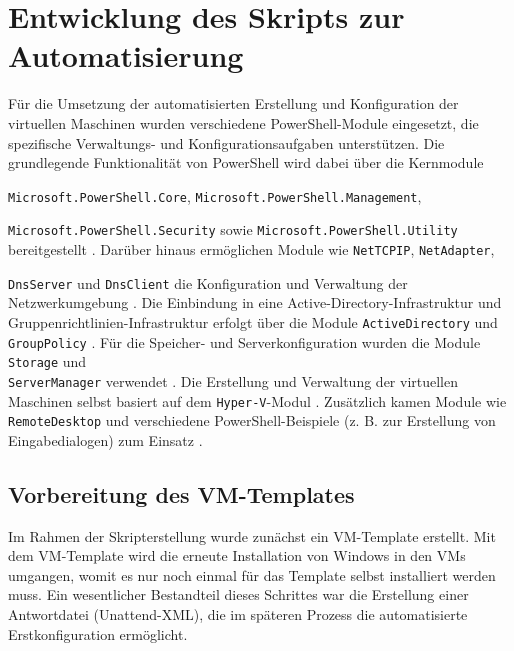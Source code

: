 \documentclass[a4paper,12pt]{article}
\begin{document}
\section{Entwicklung des Skripts zur Automatisierung}

Für die Umsetzung der automatisierten Erstellung und Konfiguration der virtuellen Maschinen
wurden verschiedene PowerShell-Module eingesetzt, die spezifische Verwaltungs- und
Konfigurationsaufgaben unterstützen. 
Die grundlegende Funktionalität von PowerShell wird dabei über die Kernmodule

\lstinline|Microsoft.PowerShell.Core|, \lstinline|Microsoft.PowerShell.Management|,

\lstinline|Microsoft.PowerShell.Security| sowie \lstinline|Microsoft.PowerShell.Utility| 
bereitgestellt \cite{microsoft2025-pscore,microsoft2025-psmanagement,microsoft2025-pssecurity,microsoft2025-psutility}. 
Darüber hinaus ermöglichen Module wie \lstinline|NetTCPIP|, \lstinline|NetAdapter|,
 
\lstinline|DnsServer| und \lstinline|DnsClient| die Konfiguration und Verwaltung der 
Netzwerkumgebung \cite{microsoft2025-nettcpip,microsoft2025-netadapter,microsoft2025-dnsserver,microsoft2025-dnsclient}. 
Die Einbindung in eine Active-Directory-Infrastruktur und Gruppenrichtlinien-Infrastruktur erfolgt über die Module 
\lstinline|ActiveDirectory| und \lstinline|GroupPolicy| \cite{microsoft2025-activedirectory,microsoft2025-grouppolicy}. 
Für die Speicher- und Serverkonfiguration wurden die Module \lstinline|Storage| und\\ \lstinline|ServerManager| 
verwendet \cite{microsoft2025-storage,microsoft2025-servermanager}. 
Die Erstellung und Verwaltung der virtuellen Maschinen selbst basiert auf dem 
\lstinline|Hyper-V|-Modul \cite{microsoft2025-hyperv}. 
Zusätzlich kamen Module wie \lstinline|RemoteDesktop| und verschiedene PowerShell-Beispiele 
(z. B. zur Erstellung von Eingabedialogen) zum Einsatz 
\cite{microsoft2025-remotedesktop,microsoft2025-custominputbox}.


\subsection{Vorbereitung des VM-Templates}

Im Rahmen der Skripterstellung wurde zunächst ein VM-Template erstellt. Mit dem VM-Template wird die erneute Installation von Windows in den VMs umgangen, womit es nur noch einmal für das Template selbst installiert werden muss.
Ein wesentlicher Bestandteil dieses Schrittes war die Erstellung einer Antwortdatei (Unattend-XML), die im späteren Prozess die automatisierte Erstkonfiguration ermöglicht.\\
\end{document}
